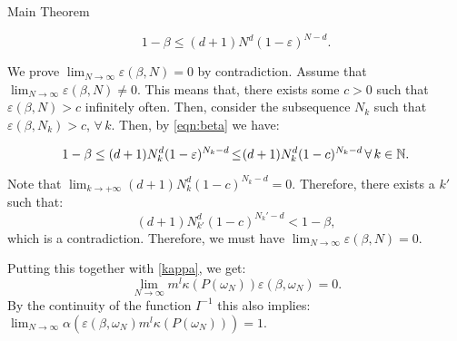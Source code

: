 \begin{subsection}{Main Theorem}
\begin{pf}
\begin{equation}\label{eqn:beta}
1-\beta \leq  (d+1)N^d (1-\varepsilon)^{N-d}.
\end{equation}

We prove $\lim_{N \to \infty} \varepsilon(\beta, N) = 0$ by contradiction. Assume that $\lim_{N \to \infty} \varepsilon(\beta, N) \not= 0$. This means that, there exists some $c > 0$ such that $\varepsilon(\beta, N) > c$ infinitely often. Then, consider the subsequence $N_k$ such that $\varepsilon(\beta, N_k) > c$, $\forall\, k.$ Then, by \eqref{eqn:beta} we have:

\begin{equation*}
1-\beta \leq  (d+1)N_k^d (1-\varepsilon)^{N_k-d}\hspace{-0.4mm} \leq \hspace{-0.7mm}(d+1)N_k^d (1-c)^{N_k-d}\, \forall\,k \in \mathbb{N}. 
\end{equation*}

Note that $\lim_{k \to +\infty}(d+1)N_k^d (1-c)^{N_k-d} = 0.$ Therefore, there exists a $k'$ such that:
$$(d+1)N_{k'}^d (1-c)^{N_k'-d} < 1 - \beta,$$ which is a contradiction. Therefore, we must have  $\lim_{N \to \infty} \varepsilon (\beta, N) = 0$.

Putting this together with \eqref{kappa}, we get:
$$\lim_{N \to \infty} m^l \kappa(P(\omega_N)) \varepsilon(\beta, \omega_N) = 0.$$ By the continuity of the function $I^{-1}$ this also implies: $\lim_{N \to \infty} \alpha \left( \varepsilon(\beta, \omega_N) m^l \kappa(P(\omega_N)) \right) = 1.$

\end{pf}

\end{subsection}